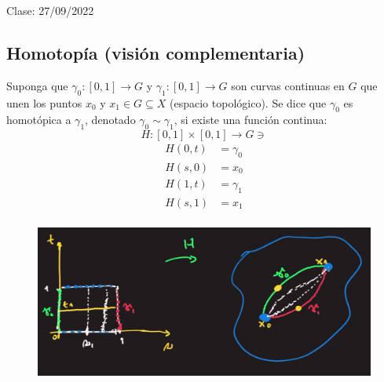 Clase: 27/09/2022

\subsection{Homotopía (visión complementaria)}

\begin{definicion}
    Suponga que $\gamma_0:[0,1]\to G$ y $\gamma_1:[0,1]\to G$ son curvas continuas en $G$ que unen los puntos $x_0$ y $x_1\in G\subseteq X$ (espacio topológico). Se dice que $\gamma_0$ es homotópica a $\gamma_1$, denotado $\gamma_0\sim \gamma_1$, si existe una función continua:
    $$H:[0,1]\times[0,1]\to G\ni$$
    \begin{align*}
        H(0,t)&=\gamma_0\\
        H(s,0)&=x_0\\
        H(1,t)&=\gamma_1\\
        H(s,1)&=x_1\\
    \end{align*}

    \begin{figure}[H]
        \centering
        \includegraphics[scale=.3]{imagenes/16.1.png}
    \end{figure}
    
\end{definicion}

